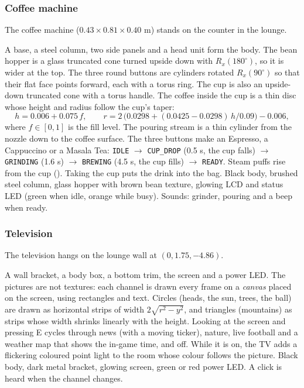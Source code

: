 \subsubsection{Coffee machine}
The coffee machine ($0.43\times0.81\times0.40$ m) stands on the counter in the lounge.

 A base, a steel column, two side panels and a head unit form the body. The bean
hopper is a glass truncated cone turned upside down with $R_x(180^\circ)$, so it is wider at the top. The three
round buttons are cylinders rotated $R_x(90^\circ)$ so that their flat face points forward, each with a torus ring.
The cup is also an upside-down truncated cone with a torus handle. The coffee inside the cup is a thin disc whose
height and radius follow the cup's taper:
\[
h = 0.006 + 0.075\,f,\qquad r = 2\,\big(0.0298 + (0.0425-0.0298)\,h/0.09\big) - 0.006,
\]
where $f\in[0,1]$ is the fill level. The pouring stream is a thin cylinder from the nozzle down to the
coffee surface.
 The three buttons make an Espresso, a Cappuccino or a Masala Tea:
\texttt{IDLE} $\rightarrow$ \texttt{CUP\_DROP} (0.5 s, the cup falls) $\rightarrow$ \texttt{GRINDING} (1.6 s) $\rightarrow$
\texttt{BREWING} (4.5 s, the cup fills) $\rightarrow$ \texttt{READY}. Steam puffs rise from the cup ().
Taking the cup puts the drink into the bag.
 Black body, brushed steel column, glass hopper with brown bean texture,
glowing LCD and status LED (green when idle, orange while busy). Sounds: grinder, pouring and a beep when ready.

\subsubsection{Television}
The television hangs on the lounge wall at $(0,1.75,-4.86)$.

 A wall bracket, a body box, a bottom trim, the screen and a power LED. The pictures
are not textures: each channel is drawn every frame on a \emph{canvas} placed on the screen, using
rectangles and text. Circles (heads, the sun, trees, the ball) are drawn as horizontal strips of width
$2\sqrt{r^2-y^2}$, and triangles (mountains) as strips whose width shrinks linearly with the height.
 Looking at the screen and pressing E cycles through news (with a moving ticker), nature,
live football and a weather map that shows the in-game time, and off. While it is on, the TV adds a
flickering coloured point light to the room whose colour follows the picture.
 Black body, dark metal bracket, glowing screen, green or red power
LED. A click is heard when the channel changes.

